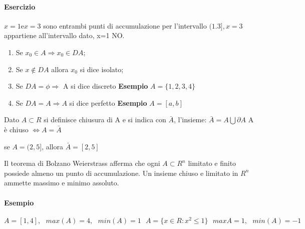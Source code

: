 \paragraph{Esercizio} $x=1 \text{e} x=3$ sono entrambi punti di accumulazione
per l'intervallo $(1.3],x=3$ appartiene all'intervallo dato, x=1 NO.

\begin{enumerate}
	\item Se $x_0\in A \Rightarrow x_0\in DA$;
	\item Se $x\notin DA$ allora $x_0$ si dice isolato;
	\item Se $DA=\phi\Rightarrow$ A si dice discreto \textbf{Esempio}
		$A=\{1,2,3,4\}$
	\item Se $DA=A\Rightarrow A$ si dice perfetto \textbf{Esempio} $A=[a,b]$
\end{enumerate}
\begin{defi}
Dato $A\subset R$ si definisce chiusura di A e si indica con $\bar{A}$,
l'insieme: $\boxed{\bar{A}=A\bigcup \partial A}$ A è chiuso
$\Leftrightarrow A=\bar{A}$
\end{defi}
\begin{esempio}
	se $A=(2,5]$, allora $\bar{A}=[2,5]$
\end{esempio}

\begin{teorema}
Il teorema di Bolzano Weierstrass afferma che ogni $A\subset R^n$ limitato e
finito possiede almeno un punto di accumulazione. Un insieme chiuso e limitato
in $R^n$ ammette massimo e minimo assoluto.
\end{teorema}
\paragraph{Esempio} $A=[1,4],\text{ } max(A)=4,\text{ } min(A)=1 \text{ }
A=\{x\in R:x^2\leq 1\} \text{ } max{A}=1, \text{ } min(A)=-1$
\clearpage


